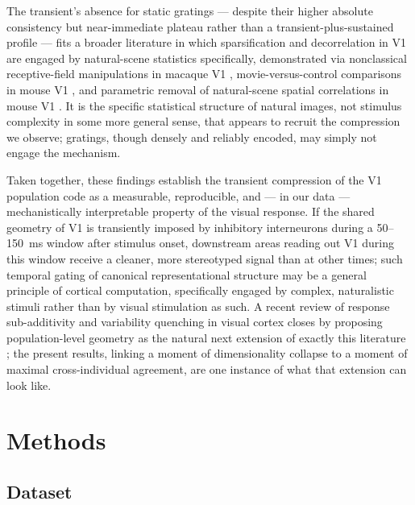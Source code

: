 \documentclass[11pt,onecolumn]{article}
\begin{document}
The transient's absence for static gratings --- despite their higher
absolute consistency but near-immediate plateau rather than a
transient-plus-sustained profile --- fits a broader literature in which
sparsification and decorrelation in V1 are engaged by natural-scene
statistics specifically, demonstrated via nonclassical receptive-field
manipulations in macaque V1 \citep{vinje2000}, movie-versus-control
comparisons in mouse V1 \citep{froudarakis2014}, and parametric removal
of natural-scene spatial correlations in mouse V1 \citep{rikhye2015}.
It is the specific statistical structure of natural images, not stimulus 
complexity in some more general sense, that appears to recruit the 
compression we observe; gratings, though densely and reliably encoded, 
may simply not engage the mechanism.

Taken together, these findings establish the transient compression of the
V1 population code as a measurable, reproducible, and --- in our data ---
mechanistically interpretable property of the visual response. 
If the shared geometry of V1 is transiently imposed by
inhibitory interneurons during a 50--150~ms window after stimulus onset,
downstream areas reading out V1 during this window receive a cleaner, more
stereotyped signal than at other times; such temporal gating of canonical
representational structure may be a general principle of cortical
computation, specifically engaged by complex, naturalistic stimuli rather
than by visual stimulation as such. A recent review of response
sub-additivity and variability quenching in visual cortex closes by
proposing population-level geometry as the natural next extension of
exactly this literature \citep{goris2024}; the present results, linking a
moment of dimensionality collapse to a moment of maximal cross-individual
agreement, are one instance of what that extension can look like.

\section{Methods}

\subsection{Dataset}
\label{Methods:Dataset}
\end{document}
